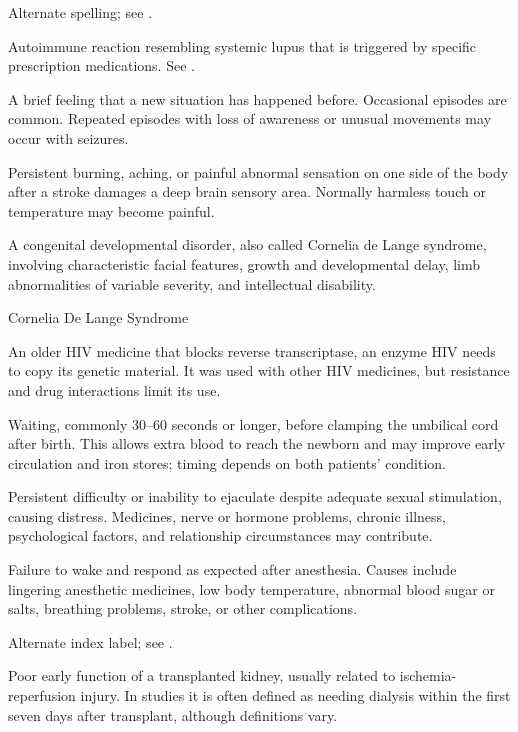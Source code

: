  Alternate spelling; see .


 Autoimmune reaction resembling systemic lupus that is triggered by specific prescription medications. See .

 A brief feeling that a new situation has happened before. Occasional episodes are common. Repeated episodes with loss of awareness or unusual movements may occur with seizures.


 Persistent burning, aching, or painful abnormal sensation on one side of the body after a stroke damages a deep brain sensory area. Normally harmless touch or temperature may become painful.

 A congenital developmental disorder, also called Cornelia de Lange syndrome, involving characteristic facial features, growth and developmental delay, limb abnormalities of variable severity, and intellectual disability.

\synonyms
Cornelia De Lange Syndrome

 An older HIV medicine that blocks reverse transcriptase, an enzyme HIV needs to copy its genetic material. It was used with other HIV medicines, but resistance and drug interactions limit its use.

 Waiting, commonly 30–60 seconds or longer, before clamping the umbilical cord after birth. This allows extra blood to reach the newborn and may improve early circulation and iron stores; timing depends on both patients’ condition.

 Persistent difficulty or inability to ejaculate despite adequate sexual stimulation, causing distress. Medicines, nerve or hormone problems, chronic illness, psychological factors, and relationship circumstances may contribute.

 Failure to wake and respond as expected after anesthesia. Causes include lingering anesthetic medicines, low body temperature, abnormal blood sugar or salts, breathing problems, stroke, or other complications.

 Alternate index label; see .

 Poor early function of a transplanted kidney, usually related to ischemia-reperfusion injury. In studies it is often defined as needing dialysis within the first seven days after transplant, although definitions vary.

